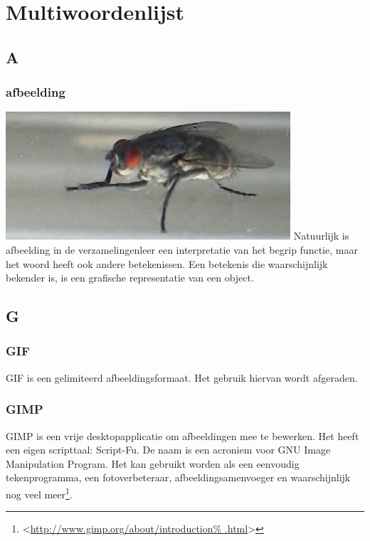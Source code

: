 \documentclass[11pt,a5paper,twoside]{book}
\newcommand{\BETEREURL}[1]{\mbox{<\url{#1}>}}
\begin{document}
\chapter{Multiwoordenlijst}
 \newenvironment{WOORD}[2]{%
  \subsection*{#1}\label{w:#1¿#2}}{}
\newcommand{\WSEC}[1]{\section*{#1}}
\newcommand{\HLI}{\\\noindent\makebox[\linewidth]{\rule{\paperwidth}{0.4pt}}}
 \WSEC{A}
  \begin{WOORD}{afbeelding}{afbeeldingen}
    \includegraphics[width=\linewidth]{e/Sarcophaga_carnaria_(Portugal2005).png}
   Natuurlijk is afbeelding in de verzamelingenleer een
    interpretatie van het begrip functie, maar het woord
    heeft ook andere betekenissen.
   Een betekenis die waarschijnlijk bekender is, is een
    grafische representatie van een object.
  \end{WOORD}
 \WSEC{G}
  \begin{WOORD}{GIF}{GIF’s}
   GIF is een gelimiteerd afbeeldingsformaat. Het gebruik hiervan wordt
    afgeraden.
  \end{WOORD}
  \begin{WOORD}{GIMP}{GIMP’en}
   GIMP is een vrije desktopapplicatie om afbeeldingen
    mee te bewerken. Het heeft een eigen scripttaal:
    Script-Fu. De naam is een acroniem voor GNU Image Manipulation
    Program. Het kan gebruikt worden als een eenvoudig tekenprogramma,
    een fotoverbeteraar, afbeeldingsamenvoeger en waarschijnlijk
    nog veel meer\footnote{\BETEREURL{http://www.gimp.org/about/introduction%
     .html}}.
  \end{WOORD}
\end{document}
